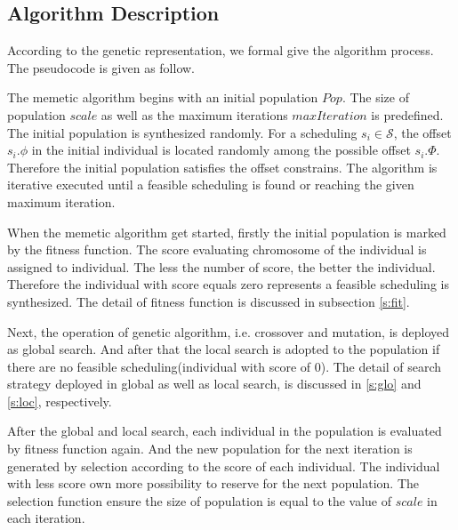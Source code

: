\documentclass[journal]{IEEEtran}
\newcommand{\calS}{\mathcal{S}}
\begin{document}
\subsection{Algorithm Description}

According to the genetic representation, we formal give the algorithm process. The pseudocode is given as follow.

The memetic algorithm begins with an initial population $Pop$. The size of population $scale$ as well as the maximum iterations $maxIteration$ is predefined.
The initial population is synthesized randomly.
For a scheduling $s_{i}\in\calS$,
 the offset $s_i.\phi$ in the initial individual is located randomly among the possible offset $s_i.\Phi$.
Therefore the initial population satisfies the offset constrains.
The algorithm is iterative executed until a feasible scheduling is found or reaching the given maximum iteration.

When the memetic algorithm get started, firstly the initial population is marked by the fitness function.
The score evaluating chromosome of the individual is assigned to individual.
The less the number of score, the better the individual.
Therefore the individual with score equals zero represents a feasible scheduling is synthesized.
The detail of fitness function is discussed in subsection \ref{s:fit}.

Next, the operation of genetic algorithm,
 i.e. crossover and mutation,
  is deployed as global search.
And after that the local search is adopted to the population if there are no feasible scheduling(individual with score of 0).
The detail of search strategy deployed in global as well as local search, is discussed in \ref{s:glo} and \ref{s:loc}, respectively.

After the global and local search,
 each individual in the population is evaluated by fitness function again.
And the new population for the next iteration is generated by selection according to the score of each individual.
The individual with less score own more possibility to reserve for the next population.
The selection function ensure the size of population is equal to the value of $scale$ in each iteration.
\end{document}
